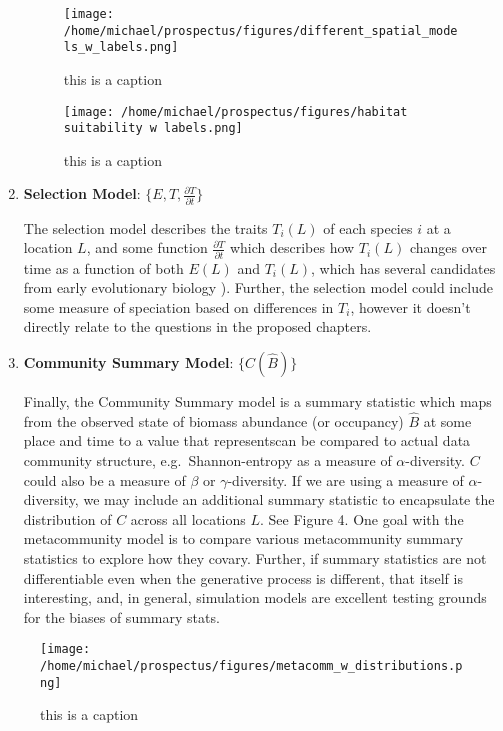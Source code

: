 \documentclass[]{article}
\begin{document}
\begin{enumerate}
  \begin{figure}[H]
  \centering
  \texttt{[image: /home/michael/prospectus/figures/different\_spatial\_models\_w\_labels.png]}
  \caption{this is a caption}
  \end{figure}

  \begin{figure}[H]
  \centering
  \texttt{[image: /home/michael/prospectus/figures/habitat suitability w labels.png]}
  \caption{this is a caption}
  \end{figure}
\item
  \textbf{Selection Model}: \(\{ E, T, \frac{\partial T}{\partial t}\}\)

  The selection model describes the traits \(T_i(L)\) of each species
  \(i\) at a location \(L\), and some function
  \(\frac{\partial T}{\partial t}\) which describes how \(T_i(L)\)
  changes over time as a function of both \(E(L)\) and \(T_i(L)\), which
  has several candidates from early evolutionary biology
  \citep{cite}). Further, the selection model could include some
  measure of speciation based on differences in \(T_i\), however it
  doesn't directly relate to the questions in the proposed chapters.
\item
  \textbf{Community Summary Model}: \(\{ C(\hat{B}) \}\)

  Finally, the Community Summary model is a summary statistic which maps
  from the observed state of biomass abundance (or occupancy)
  \(\hat{B}\) at some place and time to a value that representscan be compared to actual data
  community structure, e.g.~Shannon-entropy as a measure of
  \(\alpha\)-diversity. \(C\) could also be a measure of \(\beta\) or
  \(\gamma\)-diversity. If we are using a measure of
  \(\alpha\)-diversity, we may include an additional summary statistic
  to encapsulate the distribution of \(C\) across all locations \(L\).
  See Figure 4. One goal with the metacommunity model is to compare
  various metacommunity summary statistics to explore how they covary.
  Further, if summary statistics are not differentiable even when the
  generative process is different, that itself is interesting, and, in
  general, simulation models are excellent testing grounds for the
  biases of summary stats.
\end{enumerate}

\begin{figure}[H]
\centering
\texttt{[image: /home/michael/prospectus/figures/metacomm\_w\_distributions.png]}
\caption{this is a caption}
\end{figure}
\end{document}
